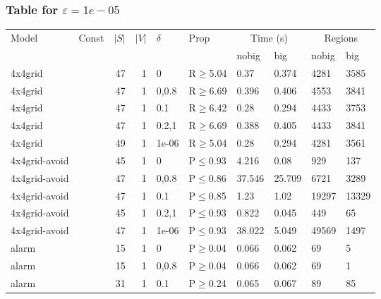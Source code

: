 \subsubsection{Table for \(\varepsilon=1e-05\)}
\begin{longtable}{llrrllllll}

        \toprule
        Model & Const & $|S|$ & $|V|$ & $\delta$ & Prop & \multicolumn{2}{c}{Time (s)} & \multicolumn{2}{c}{Regions} \\
        \cmidrule(ll){7-8} \cmidrule(ll){9-10}
        & & & & & & nobig & big & nobig & big \\
        \midrule
        
 4x4grid       &          &     	47 & 1 & 0     & R$\geq$5.04  & 0.37     & 0.374    & 4281    & 3585   \\
 4x4grid       &          &     	47 & 1 & 0,0.8 & R$\geq$6.69  & 0.396    & 0.406    & 4553    & 3841   \\
 4x4grid       &          &     	47 & 1 & 0.1   & R$\geq$6.42  & 0.28     & 0.294    & 4433    & 3753   \\
 4x4grid       &          &     	47 & 1 & 0.2,1 & R$\geq$6.69  & 0.388    & 0.405    & 4433    & 3841   \\
 4x4grid       &          &     	49 & 1 & 1e-06 & R$\geq$5.04  & 0.28     & 0.294    & 4281    & 3561   \\
 4x4grid-avoid &          &     	45 & 1 & 0     & P$\leq$0.93  & 4.216    & 0.08     & 929     & 137    \\
 4x4grid-avoid &          &     	47 & 1 & 0,0.8 & P$\leq$0.86  & 37.546   & 25.709   & 6721    & 3289   \\
 4x4grid-avoid &          &     	47 & 1 & 0.1   & P$\leq$0.85  & 1.23     & 1.02     & 19297   & 13329  \\
 4x4grid-avoid &          &     	45 & 1 & 0.2,1 & P$\leq$0.93  & 0.822    & 0.045    & 449     & 65     \\
 4x4grid-avoid &          &     	47 & 1 & 1e-06 & P$\leq$0.93  & 38.022   & 5.049    & 49569   & 1497   \\
 alarm         &          &     	15 & 1 & 0     & P$\geq$0.04  & 0.066    & 0.062    & 69      & 5      \\
 alarm         &          &     	15 & 1 & 0,0.8 & P$\geq$0.04  & 0.066    & 0.062    & 69      & 1      \\
 alarm         &          &     	31 & 1 & 0.1   & P$\geq$0.24  & 0.065    & 0.067    & 89      & 85     \\

\end{longtable}
